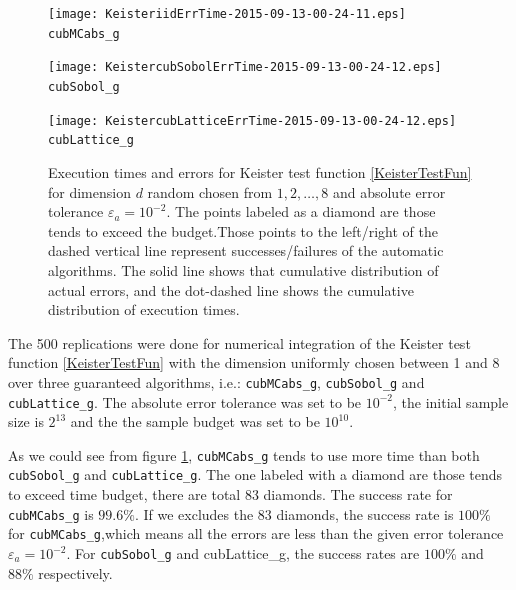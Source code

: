 \documentclass{iitthesis}
\begin{document}
\begin{figure}
\centering
\begin{minipage}{9cm} \centering \texttt{[image: KeisteriidErrTime-2015-09-13-00-24-11.eps]} \\ {\tt cubMCabs\_g} \end{minipage}
\begin{minipage}{7cm} \centering \texttt{[image: KeistercubSobolErrTime-2015-09-13-00-24-12.eps]} \\ {\tt cubSobol\_g} \end{minipage}
\begin{minipage}{7cm} \centering \texttt{[image: KeistercubLatticeErrTime-2015-09-13-00-24-12.eps]} \\ {\tt cubLattice\_g} \end{minipage}
\caption{Execution times and errors for Keister test function \eqref{KeisterTestFun} for dimension $d$ random chosen from $1, 2, \ldots, 8$ and absolute error tolerance $\varepsilon_a=10^{-2}$. The points labeled as a diamond are those tends to exceed the budget.Those points to the left/right of the dashed vertical line represent successes/failures of the automatic algorithms.  The solid line shows that cumulative distribution of actual errors, and the dot-dashed line shows the cumulative distribution of execution times. \label{fig:keistertestfunabstol}}
\end{figure}

The 500 replications were done for numerical integration of the Keister test function \eqref{KeisterTestFun} with the dimension uniformly chosen between 1 and 8 over three guaranteed algorithms, i.e.: {\tt cubMCabs\_g}, {\tt cubSobol\_g} and {\tt cubLattice\_g}. The absolute error tolerance was set to be $10^{-2}$, the initial sample size is $2^{13}$ and the the sample budget was set to be $10^{10}$.

As we could see from figure \ref{fig:keistertestfunabstol}, {\tt cubMCabs\_g} tends to use more time than both {\tt cubSobol\_g} and {\tt cubLattice\_g}. The one labeled with a diamond are those tends to exceed time budget, there are total 83 diamonds. The success rate for {\tt cubMCabs\_g} is $99.6\%$. If we excludes the 83 diamonds, the success rate is $100\%$ for {\tt cubMCabs\_g},which means all the errors are less than the given error tolerance $\varepsilon_a = 10^{-2}$. For {\tt cubSobol\_g} and {cubLattice\_g}, the success rates are $100\%$ and $88\%$ respectively.
\end{document}
